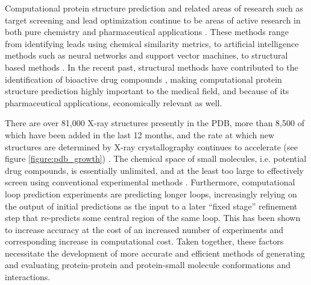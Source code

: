 Computational protein structure prediction and related areas of research such as target screening and lead optimization continue to be areas of active research in both pure chemistry and pharmaceutical applications \cite{jorgensen2009efficient}.
These methods range from identifying leads using chemical similarity metrics, to artificial intelligence methods such as neural networks and support vector machines, to structural based methods \cite{geppert2010current}.
In the recent past, structural methods have contributed to the identification of bioactive drug compounds \cite{corsino2009novel}, making computational protein structure prediction highly important to the medical field, and because of its pharmaceutical applications, economically relevant as well.

There are over 81,000 X-ray structures presently in the PDB, more than 8,500 of which have been added in the last 12 months, and the rate at which new structures are determined by X-ray crystallography continues to accelerate (see figure \ref{figure:pdb_growth}) \cite{berman2007worldwide}.
The chemical space of small molecules, i.e. potential drug compounds, is essentially unlimited, and at the least too large to effectively screen using conventional experimental methods \cite{jorgensen2009efficient}. 
Furthermore, computational loop prediction experiments are predicting longer loops, increasingly relying on the output of initial predictions as the input to a later ``fixed stage'' refinement step that re-predicts some central region of the same loop.
This has been shown to increase accuracy \cite{jacobson2004hierarchical} at the cost of an increased number of experiments and corresponding increase in computational cost.
Taken together, these factors necessitate the development of more accurate and efficient methods of generating and evaluating protein-protein and protein-small molecule conformations and interactions.

